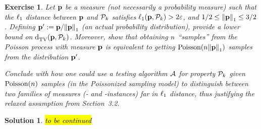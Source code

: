 \documentclass[biber]{nowfnt} %
\newtheorem{question}{Exercise}[chapter]
\newtheorem{solution}{Solution}[chapter]
\newcommand{\tbc}{\noindent\hl{\sc{}to be continued}\xspace}
\newcommand{\tbc}{}
\begin{document}
\begin{question}\label{exo:notrealproba:lb}
Let $\p$ be a measure (not necessarily a probability measure) such that the $\lp[1]$ distance between $\p$ and $\property_\ab$ satisfies $\lp[1](\p,\property_\ab)>2\dst$, and $1/2\leq \normone{\p} \leq 3/2$. Defining $\p' \eqdef \p/\normone{\p}$ (an actual probability distribution), provide a lower bound on $\totalvardist{\p}{\property_\ab}$. Moreover, show that obtaining $\ns$ ``samples'' from the Poisson process with measure $\p$ is equivalent to getting $\poisson{\ns\normone{\p}}$ samples from the distribution $\p'$.

Conclude with how one could use a testing algorithm $\Algo$ for property $\property_\ab$ given $\poisson{\ns}$ samples (\ie in the Poissonized sampling model) to distinguish between two families of measures (\yes- and \no-instances) far in $\lp[1]$ distance, thus justifying the relaxed assumption from Section~3.2.
\end{question}
\begin{solution}
\tbc
\end{solution}
\end{document}
